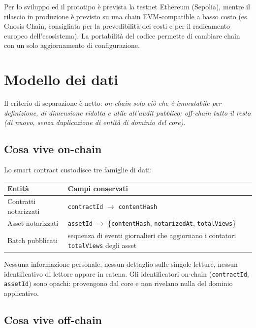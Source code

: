 \documentclass[a4paper,11pt]{article}
\begin{document}
\noindent Per lo sviluppo ed il prototipo \`e prevista la testnet Ethereum (Sepolia), mentre il rilascio in produzione \`e previsto su una chain EVM-compatible a basso costo (es. Gnosis Chain, consigliata per la prevedibilit\`a dei costi e per il radicamento europeo dell'ecosistema). La portabilit\`a del codice permette di cambiare chain con un solo aggiornamento di configurazione.

\section{Modello dei dati}\label{sec:dati}

Il criterio di separazione \`e netto: \emph{on-chain solo ci\`o che \`e immutabile per definizione, di dimensione ridotta e utile all'audit pubblico; off-chain tutto il resto (di nuovo, senza duplicazione di entit\`a di dominio del core).}

\subsection{Cosa vive on-chain}

Lo smart contract custodisce tre famiglie di dati:

\begin{center}
\begin{tabularx}{\textwidth}{lX}
\toprule
\textbf{Entit\`a} & \textbf{Campi conservati} \\
\midrule
Contratti notarizzati & \texttt{contractId} \(\to\) \texttt{contentHash} \\
Asset notarizzati     & \texttt{assetId} \(\to\) \{\texttt{contentHash}, \texttt{notarizedAt}, \texttt{totalViews}\} \\
Batch pubblicati      & sequenza di eventi giornalieri che aggiornano i contatori \texttt{totalViews} degli asset \\
\bottomrule
\end{tabularx}
\end{center}

\noindent Nessuna informazione personale, nessun dettaglio sulle singole letture, nessun identificativo di lettore appare in catena. Gli identificatori on-chain (\texttt{contractId}, \texttt{assetId}) sono opachi: provengono dal core e non rivelano nulla del dominio applicativo.

\subsection{Cosa vive off-chain}
\end{document}
